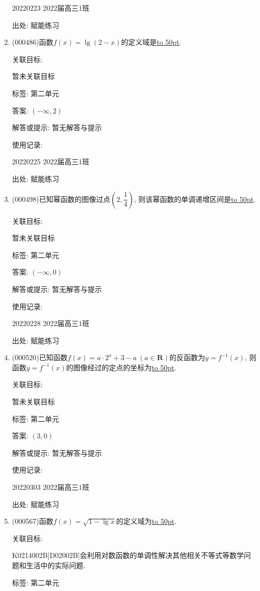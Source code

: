 \documentclass[10pt,a4paper]{article}
\newcommand{\blank}[1]{\underline{\hbox to #1pt{}}}
\begin{document}
\begin{enumerate}[1.]
20220223	2022届高三1班	


出处: 赋能练习
\item { (000486)}函数$f(x)=\lg(2-x)$的定义域是\blank{50}.


关联目标:

暂未关联目标



标签: 第二单元

答案: $(-\infty ,2)$

解答或提示: 暂无解答与提示

使用记录:

20220225	2022届高三1班	


出处: 赋能练习
\item { (000498)}已知幂函数的图像过点$(2,\dfrac14)$, 则该幂函数的单调递增区间是\blank{50}.


关联目标:

暂未关联目标



标签: 第二单元

答案: $(-\infty ,0)$

解答或提示: 暂无解答与提示

使用记录:

20220228	2022届高三1班	


出处: 赋能练习
\item { (000520)}已知函数$f(x)=a\cdot 2^x+3-a\ (a\in \mathbf{R})$的反函数为$y=f^{-1}(x)$, 则函数$y=f^{-1}(x)$的图像经过的定点的坐标为\blank{50}.


关联目标:

暂未关联目标



标签: 第二单元

答案: $(3,0)$

解答或提示: 暂无解答与提示

使用记录:

20220303	2022届高三1班	


出处: 赋能练习
\item { (000567)}函数$f(x)=\sqrt{1-\lg x}$的定义域为\blank{50}.


关联目标:

K0214002B|D02002B|会利用对数函数的单调性解决其他相关不等式等数学问题和生活中的实际问题.



标签: 第二单元


\end{enumerate}
\end{document}
